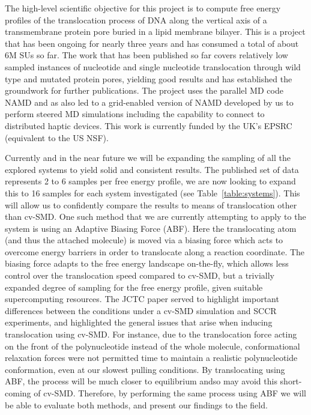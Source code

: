 \documentclass[a4paper,10pt]{article}
\begin{document}
The high-level scientific objective for this project is to compute free energy profiles of the translocation process of DNA along the vertical axis of a transmembrane protein pore buried in a lipid membrane bilayer. This is a project that has been ongoing for nearly three years %
and has consumed a total of about 6M SUs so far. The work that has been published so far covers relatively low sampled instances of nucleotide and single nucleotide translocation through wild type and mutated protein pores, yielding good results and has established the groundwork for further publications. The project uses the parallel MD code NAMD and as also led to a grid-enabled version of NAMD developed by us to perform steered MD simulations including the capability to connect to distributed haptic devices. This work is currently funded by the UK's EPSRC (equivalent to the US NSF). %

Currently and in the near future we will be expanding the sampling of
all the explored systems to yield solid and consistent results. The
published set of data represents 2 to 6 samples per free energy
profile, we are now looking to expand this to 16 samples for each
system investigated (see Table~\ref{table:systems}). This will allow
us to confidently compare the results to means of translocation other
than cv-SMD. One such method that we are currently attempting to apply
to the system is using an Adaptive Biasing Force (ABF). Here the
translocating atom (and thus the attached molecule) is moved via a
biasing force which acts to overcome energy barriers in order to
translocate along a reaction coordinate. The biasing force adapts to
the free energy landscape on-the-fly, which allows less control over
the translocation speed compared to cv-SMD, but a trivially expanded
degree of sampling for the free energy profile, given suitable
supercomputing resources. The JCTC paper served to highlight important
differences between the conditions under a cv-SMD simulation and SCCR
experiments, and highlighted the general issues that arise when
inducing translocation using cv-SMD. For instance, due to the
translocation force acting on the front of the polynucleotide instead
of the whole molecule, conformational relaxation forces were not
permitted time to maintain a realistic polynucleotide conformation,
even at our slowest pulling conditions. By translocating using ABF,
the process will be much closer to equilibrium andso may avoid this
short-coming of cv-SMD. Therefore, by performing the same process
using ABF we will be able to evaluate both methods, and present our
findings to the field.
\end{document}
